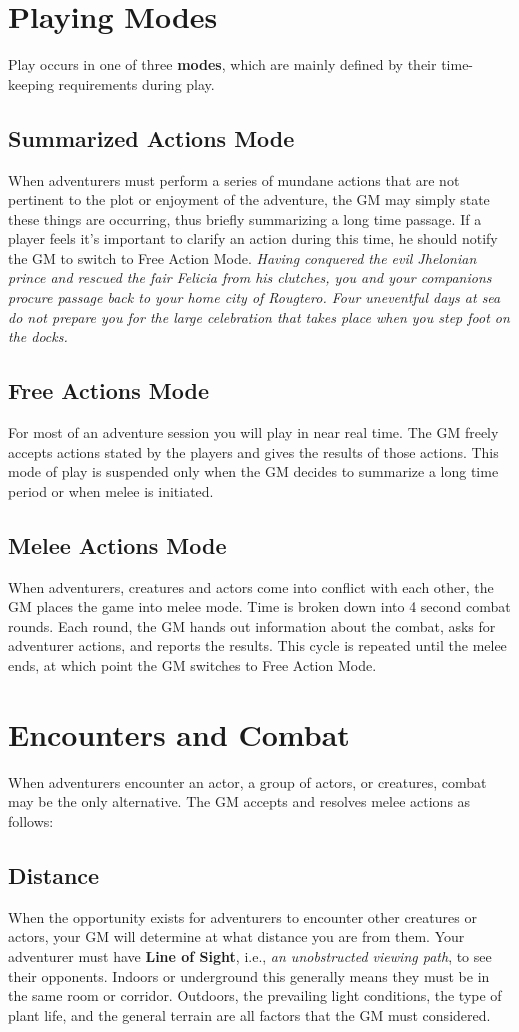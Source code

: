 \begin{multicols*}{2}
\section{Playing Modes}
Play occurs in one of three \textbf{modes}, which are mainly defined by their time-keeping requirements during play.
\subsection{Summarized Actions Mode}
When adventurers must perform a series of mundane actions that are not pertinent to the plot or  enjoyment of the adventure, the GM may simply state these things are occurring, thus briefly summarizing a long time passage. If a player feels it's important to clarify an action during this time, he should notify the GM to switch to Free Action Mode.
\textit{Having conquered the evil Jhelonian prince and rescued the fair Felicia from his clutches, you and your 
companions procure passage back to your home city of Rougtero. Four uneventful days at sea do not prepare you for the large celebration that takes place when you step foot on the docks.}
\subsection{Free Actions Mode}
For most of an adventure session you will play in near real time. The GM freely accepts actions stated by the players and gives the results of those actions. This mode of play is suspended only when the GM decides to summarize a long time period or when melee is initiated.
\subsection{Melee Actions Mode}
When adventurers, creatures and actors come into conflict with each other, the GM places the game into melee mode. Time is broken down into 4 second combat rounds. Each round, the GM hands out information about the combat, asks for adventurer actions, and reports the results. This cycle is repeated until the melee ends, at which point the GM switches to Free Action Mode.
\section{Encounters and Combat}
When adventurers encounter an actor, a group of actors, or creatures, combat may be the only alternative. The GM accepts and resolves melee actions as follows:
\subsection{Distance}
When the opportunity exists for adventurers to encounter other creatures or actors, your GM will determine at what distance you are from them. Your adventurer must have \textbf{Line of Sight}, i.e., \textit{an unobstructed viewing path}, to see their opponents. Indoors or underground this generally means they must be in the same room or corridor. Outdoors, the prevailing light conditions, the type of plant life, and the general terrain are all factors that the GM must considered.

\end{multicols*}
